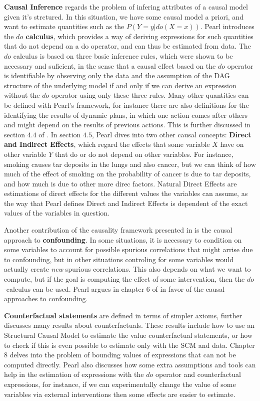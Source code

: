 \textbf{Causal Inference} regards the problem of infering attributes of a causal model given it's strctured. In this situation, we have some causal model a priori, and want to estimate quantities such as the $P(Y=y|do(X=x))$. Pearl introduces the \textbf{$do$ calculus}, which provides a way of deriving expressions for such quantities that do not depend on a do operator, and can thus be estimated from data. The $do$ calculus is based on three basic inference rules, which were shown to be necessary and suficient, in the sense that a causal effect based on the $do$ operator is identifiable by observing only the data and the assumption of the DAG structure of the underlying model if and only if we can derive an expression without the $do$ operator using only these three rules. Many other quantities can be defined with Pearl's framework, for instance there are also definitions for the identifying the results of dynamic plans, in which one action comes after others and might depend on the results of previous actions. This is further discussed in section $4.4$ of \cite{Causality}. In section $4.5$, Pearl dives into two other causal concepts: \textbf{Direct and Indirect Effects}, which regard the effects that some variable $X$ have on other variable $Y$ that do or do not depend on other variables. For instance, smoking causes tar deposits in the lungs and also cancer, but we can think of how much of the effect of smoking on the probability of cancer is due to tar deposits, and how much is due to other more direc factors. Natural Direct Effects are  estimations of direct effects for the different values the variables can assume, as the way that Pearl defines Direct and Indirect Effects is dependent of the exact values of the variables in question.

Another contribution of the causality framework presented in \cite{Causality} is the causal approach to \textbf{confounding}. In some situations, it is necessary to condition on some variables to account for possible spurious correlations that might arrise due to confounding, but in other situations controling for some variables would actually create \emph{new} spurious correlations. This also depends on what we want to compute, but if the goal is computing the effect of some intervention, then the $do$-calculus can be used. Pearl argues in chapter $6$ of \cite{Causality} in favor of the causal approaches to confounding.

\textbf{Counterfactual statements} are defined in terms of simpler axioms, \cite[Chapter~7]{Causality} further discusses many results about counterfactuals. These results include how to use an Structural Causal Model to estimate the value counterfactual statements, or how to check if this is even possible to estimate only with the SCM and data. Chapter $8$ delves into the problem of bounding values of expressions that can not be computed directly. Pearl also discusses how some extra assumptions and tools can help in the estimation of expressions with the $do$ operator and counterfactual expressions, for instance, if we can experimentally change the value of some variables via external interventions then some effects are easier to estimate.

